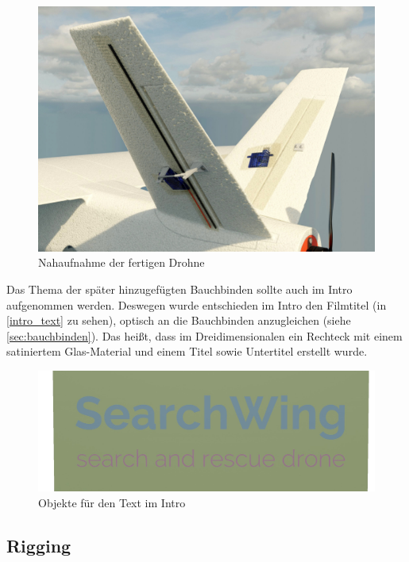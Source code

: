 \begin{figure}[H]
\begin{center}
\includegraphics[width=\textwidth]{gfx/prod/plane/shading.jpg}
\caption{Nahaufnahme der fertigen Drohne}
\label{shading}
\end{center}
\end{figure}

Das Thema der später hinzugefügten Bauchbinden sollte auch im Intro aufgenommen werden. Deswegen wurde entschieden im Intro den Filmtitel (in \autoref{intro_text} zu sehen), optisch an die Bauchbinden anzugleichen (siehe \autoref{sec:bauchbinden}). Das heißt, dass im Dreidimensionalen ein Rechteck mit einem satiniertem Glas-Material und einem Titel sowie Untertitel erstellt wurde.

\begin{figure}[H]
\begin{center}
\includegraphics[width=\textwidth]{gfx/prod/env/intro_text.jpg}
\caption{Objekte für den Text im Intro}
\label{intro_text}
\end{center}
\end{figure}

\subsection{Rigging}

